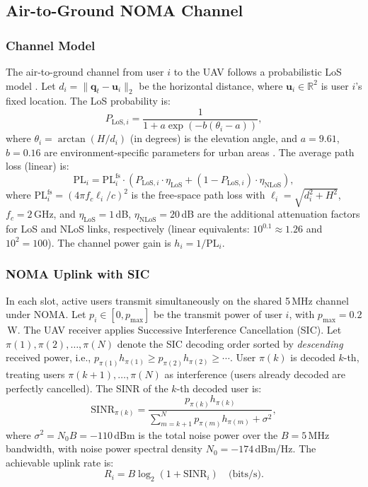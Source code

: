 \documentclass[journal]{IEEEtran}
\begin{document}
\subsection{Air-to-Ground NOMA Channel}

\subsubsection{Channel Model}
The air-to-ground channel from user $i$ to the UAV follows a
probabilistic LoS model \cite{zeng2019uav_survey}.
Let $d_i = \|\bm{q}_t - \bm{u}_i\|_2$ be the horizontal distance,
where $\bm{u}_i \in \mathbb{R}^2$ is user $i$'s fixed location.
The LoS probability is:
\begin{equation}
  P_{\text{LoS},i} = \frac{1}{1 + a \exp\!\left(-b(\theta_i - a)\right)},
  \label{eq:plos}
\end{equation}
where $\theta_i = \arctan(H / d_i)$ (in degrees) is the elevation
angle, and $a = 9.61$, $b = 0.16$ are environment-specific
parameters for urban areas \cite{zeng2019uav_survey}.
The average path loss (linear) is:
\begin{equation}
  \text{PL}_i = \text{PL}^{\text{fs}}_i \cdot
    \left(P_{\text{LoS},i} \cdot \eta_{\text{LoS}} +
          (1 - P_{\text{LoS},i}) \cdot \eta_{\text{NLoS}}\right),
  \label{eq:pl}
\end{equation}
where $\text{PL}^{\text{fs}}_i = (4\pi f_c \ell_i / c)^2$
is the free-space path loss with $\ell_i = \sqrt{d_i^2 + H^2}$,
$f_c = 2$\,GHz, and $\eta_{\text{LoS}} = 1$\,dB,
$\eta_{\text{NLoS}} = 20$\,dB are the additional attenuation
factors for LoS and NLoS links, respectively
(linear equivalents: $10^{0.1} \approx 1.26$ and $10^{2} = 100$).
The channel power gain is $h_i = 1/\text{PL}_i$.

\subsubsection{NOMA Uplink with SIC}

In each slot, active users transmit simultaneously on the shared
5\,MHz channel under NOMA.
Let $p_i \in [0, p_{\max}]$ be the transmit power of user $i$,
with $p_{\max} = 0.2$\,W.
The UAV receiver applies Successive Interference Cancellation (SIC).
Let $\pi(1), \pi(2), \ldots, \pi(N)$ denote the SIC decoding order
sorted by \emph{descending} received power, i.e.,
$p_{\pi(1)} h_{\pi(1)} \ge p_{\pi(2)} h_{\pi(2)} \ge \cdots$.
User $\pi(k)$ is decoded $k$-th, treating users
$\pi(k{+}1), \ldots, \pi(N)$ as interference (users already decoded
are perfectly cancelled).
The SINR of the $k$-th decoded user is:
\begin{equation}
  \text{SINR}_{\pi(k)} = \frac{p_{\pi(k)} h_{\pi(k)}}
    {\displaystyle\sum_{m=k+1}^{N} p_{\pi(m)} h_{\pi(m)} + \sigma^2},
  \label{eq:sinr}
\end{equation}
where $\sigma^2 = N_0 B = -110$\,dBm is the total noise power
over the $B{=}5$\,MHz bandwidth, with noise power spectral
density $N_0 = -174$\,dBm/Hz.
The achievable uplink rate is:
\begin{equation}
  R_i = B \log_2(1 + \text{SINR}_i) \quad \text{(bits/s)}.
  \label{eq:rate}
\end{equation}
\end{document}
